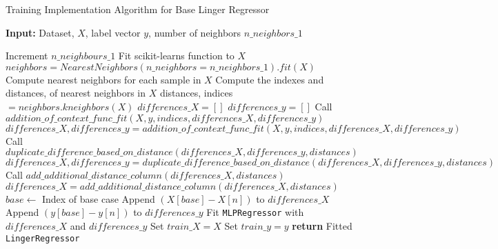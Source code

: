 \documentclass[a4paper, 12pt]{report}
\begin{document}
\begin{algorithm}[H]
    \caption{Training Implementation Algorithm for Base Linger Regressor}
    \textbf{Input:} Dataset, $X$, label vector $y$, number of neighbors $n\_neighbors\_1$
    \label{alg:base_linger_regressor_train_implementation}
    \begin{algorithmic}[1]
            \State Increment $n\_neighbours\_1$
            \Comment Fit scikit-learns  function to $X$
            \State $neighbors = NearestNeighbors(n\_neighbors=n\_neighbors\_1).fit(X)$
            \State Compute nearest neighbors for each sample in $X$
            \State Compute the indexes and distances, of nearest neighbors in $X$
            \State distances, indices $= neighbors.kneighbors(X)$
            \State $differences\_X = []$ 
            \State $differences\_y = []$
                \State Call $addition\_of\_context\_func\_fit(X, y, indices, differences\_X, differences\_y)$
                \State $differences\_X, differences\_y = addition\_of\_context\_func\_fit(X, y, indices, differences\_X, differences\_y)$
                \State Call $duplicate\_difference\_based\_on\_distance(differences\_X, differences\_y, distances)$
                \State $differences\_X, differences\_y = duplicate\_difference\_based\_on\_distance(differences\_X, differences\_y, distances)$
                \State Call $add\_additional\_distance\_column(differences\_X, distances)$
                \State $differences\_X = add\_additional\_distance\_column(differences\_X, distances)$
            \Else
                    \State $base \gets$ Index of base case
                        \State Append $(X[base] - X[n])$ to $differences\_X$
                        \State Append $(y[base] - y[n])$ to $differences\_y$
                    \EndFor
                \EndFor  
            \EndIf
            \State Fit \texttt{MLPRegressor} with $differences\_X$ and $differences\_y$
            \State Set $train\_X = X$
            \State Set $train\_y = y$
            \State \textbf{return} Fitted \texttt{LingerRegressor}
        \EndFunction
    \end{algorithmic}
\end{algorithm}
\end{document}
